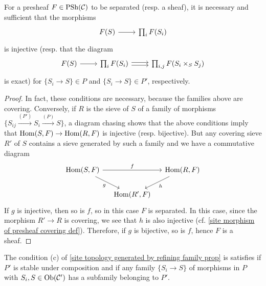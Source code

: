 \begin{corollary}\label{site topology generated by refining family sheaf iff}
For a presheaf $F\in\mathrm{PSh}(\mathcal{C})$ to be separated (resp. a sheaf), it is necessary and sufficient that the morphisms
\[\begin{tikzcd}
F(S)\ar[r]&\prod_iF(S_i)
\end{tikzcd}\]
is injective (resp. that the diagram
\[\begin{tikzcd}
F(S)\ar[r]&\prod_iF(S_i)\ar[r,shift left=2pt]\ar[r,shift right=2pt]&\prod_{i,j}F(S_i\times_SS_j)
\end{tikzcd}\]
is exact) for $\{S_i\to S\}\in P$ and $\{S_i\to S\}\in P'$, respectively.
\end{corollary}
\begin{proof}
In fact, these conditions are necessary, because the families above are covering. Conversely, if $R$ is the sieve of $S$ of a family of morphisms $\{S_{ij}\stackrel{(P')}{\to} S_i\stackrel{(P)}{\to} S\}$, a diagram chasing shows that the above conditions imply that $\mathrm{Hom}(S,F)\to\mathrm{Hom}(R,F)$ is injective (resp. bijective). But any covering sieve $R'$ of $S$ contains a sieve generated by such a family and we have a commutative diagram
\[\begin{tikzcd}[row sep=6mm,column sep=4mm]
\Hom(S,F)\ar[rr,"f"]\ar[rd,swap,"g"]&&\Hom(R,F)\ar[ld,"h"]\\
&\Hom(R',F)&
\end{tikzcd}\]
If $g$ is injective, then so is $f$, so in this case $F$ is separated. In this case, since the morphism $R'\to R$ is covering, we see that $h$ is also injective (cf. \cref{site morphism of presheaf covering def}). Therefore, if $g$ is bijective, so is $f$, hence $F$ is a sheaf.
\end{proof}

\begin{remark}
The condition (c) of \cref{site topology generated by refining family prop} is satisfies if $P'$ is stable under composition and if any family $\{S_i\to S\}$ of morphisms in $P$ with $S_i,S\in\mathrm{Ob}(\mathcal{C}')$ has a subfamily belonging to $P'$.
\end{remark}

